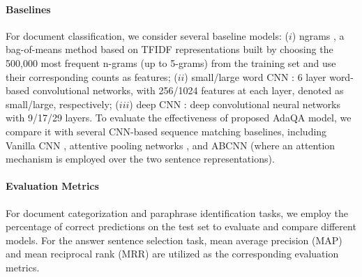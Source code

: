 \documentclass[11pt,a4paper]{article}
\begin{document}
\paragraph{Baselines}
For document classification, we consider several baseline models: ($i$) ngrams \citep{zhang2015character}, a bag-of-means method based on TFIDF representations built by choosing the 500,000 most frequent n-grams (up to 5-grams) from the training set and use their corresponding counts as features; 
($ii$) small/large word CNN \citep{zhang2015character}: 6 layer word-based convolutional networks, with 256/1024 features at each layer, denoted as small/large, respectively;
($iii$) deep CNN \citep{conneau2016very}: deep convolutional neural networks with 9/17/29 layers.
To evaluate the effectiveness of proposed AdaQA model, we compare it with several CNN-based sequence matching baselines, including Vanilla CNN \citep{jurczyk2016selqa,santos2017learning}, attentive pooling networks \citep{dos2016attentive}, and ABCNN \citep{yin2015abcnn} (where an attention mechanism is employed over the two sentence representations).
\paragraph{Evaluation Metrics}
For document categorization and  paraphrase identification tasks, we employ the percentage of correct predictions on the test set to evaluate and compare different models. For the answer sentence selection task, mean average precision (MAP) and mean reciprocal rank (MRR) are utilized as the corresponding evaluation metrics.
\end{document}
